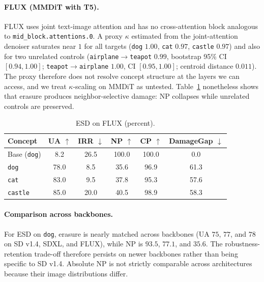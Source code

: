 \paragraph{FLUX (MMDiT with T5).} FLUX uses joint text-image attention and has
no cross-attention block analogous to \texttt{mid\_block.attentions.0}. A proxy
$\kappa$ estimated from the joint-attention denoiser saturates near $1$ for all
targets (\texttt{dog} $1.00$, \texttt{cat} $0.97$, \texttt{castle} $0.97$) and
also for two unrelated controls (\texttt{airplane}$\to$\texttt{teapot} $0.99$,
bootstrap 95\% CI $[0.94,1.00]$; \texttt{teapot}$\to$\texttt{airplane} $1.00$,
CI $[0.95,1.00]$; centroid distance $0.011$). The proxy therefore does not
resolve concept structure at the layers we can access, and we treat
$\kappa$-scaling on MMDiT as untested. Table~\ref{tab:flux} nonetheless shows
that erasure produces neighbor-selective damage: NP collapses while unrelated
controls are preserved.

\begin{table}[h]\centering\small
\caption{ESD on FLUX (percent).}\label{tab:flux}
\begin{tabular}{lccccc}\toprule
Concept & UA $\uparrow$ & IRR $\downarrow$ & NP $\uparrow$ & CP $\uparrow$ & DamageGap $\downarrow$\\\midrule
Base (\texttt{dog}) & 8.2 & 26.5 & 100.0 & 100.0 & 0.0\\
\texttt{dog} & 78.0 & 8.5 & 35.6 & 96.9 & 61.3\\
\texttt{cat} & 83.0 & 9.5& 37.8 & 95.3 & 57.6\\
\texttt{castle} & 85.0 &20.0 & 40.5 & 98.9 & 58.3\\\bottomrule
\end{tabular}
\end{table}

\paragraph{Comparison across backbones.} For ESD on \texttt{dog}, erasure is
nearly matched across backbones (UA $75$, $77$, and $78$ on SD v1.4, SDXL, and
FLUX), while NP is $93.5$, $77.1$, and $35.6$. The robustness-retention
trade-off therefore persists on newer backbones rather than being specific to
SD v1.4. Absolute NP is not strictly comparable across architectures because
their image distributions differ.
